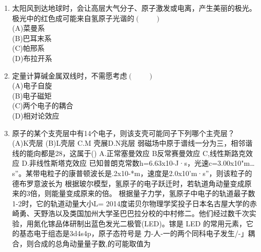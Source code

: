 \begin{enumerate}
(A)强度\\
(B)波长\\
(C)偏振方向\\
(D)照射时间
\item 太阳风到达地球时，会让高层大气分子、原子激发或电离，产生美丽的极光。极光中的红色成可能来自氢原子光谐的$(\qquad)$\\
(A)菜曼系\\
(B)巴耳末系\\
(C)帕邢系\\
(D)布拉开系
\item 定量计算碱金属双线时，不需愿考虑$(\qquad)$\\
(A)电子自旋\\
(B)电子磁矩\\
(C)两个电子的耦合\\
(D)相对论效应
\item 原子的某个支壳层中有14个电子，则该支壳可能同子下列哪个主壳层？\\
(A)K壳层
(B)L壳层
C.M 壳展D.N兆层
弱磁场中原于谱线一分为三，相邻谐线的能向都是28，这属于()
A.正常塞曼效应 B反常赛曼效应 C,线性斯路克效应 D.非线性斯塔克效应
已知普朗克常数h=6.63x10-J·s，光速c=3.00x10"m…s”。某带电粒子的康普顿波长是.2x10-*m，速度是2.0x10'm·s”，则该粒子的德布罗意波长为
根据玻尔模型，氢原子的电子跃迁时，若轨道角动量变成原来的3倍，则能量变成原来的倍。
根据量子力学，氢原子中电子的轨道最子数1-2时，它的轨道动量大小L=
2014度诺贝尔物理学奖投子日本名古屋大学的赤崎勇、天野浩以及类国加州大学圣巴巴拉分校的中村修二。他们经过数千次实验，用氮化镓品体研制出蓝色发光二极管(LED)。镓是 LED 的常用元素，它的基态电于组态是3d4s4p，原子态符号是
力-人-一的两个同科电子发生/-」耦合，则合成的总角动量量子数,的可能取值为
\end{enumerate}
